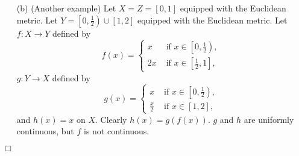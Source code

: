 \documentclass{article}
\begin{document}
\begin{enumerate}
\begin{enumerate}
  \item[(b)]
  (Another example)
  Let $X = Z = [0,1]$ equipped with the Euclidean metric.
  Let $Y = \left[0,\frac{1}{2}\right) \cup [1,2]$ equipped with the Euclidean metric.
  Let $f: X \to Y$ defined by
  \begin{equation*}
  f(x) =
    \begin{cases}
      x  & \text{ if } x \in \left[0,\frac{1}{2}\right), \\
      2x & \text{ if } x \in \left[\frac{1}{2},1\right],
    \end{cases}
  \end{equation*}
  $g: Y \to X$ defined by
  \begin{equation*}
  g(x) =
    \begin{cases}
      x           & \text{ if } x \in \left[0,\frac{1}{2}\right), \\
      \frac{x}{2} & \text{ if } x \in \left[1,2\right],
    \end{cases}
  \end{equation*}
  and $h(x) = x$ on $X$. Clearly $h(x) = g(f(x))$.
  $g$ and $h$ are uniformly continuous, but $f$ is not continuous.
  \end{enumerate}
\end{enumerate}
$\Box$\\\\



\end{document}
